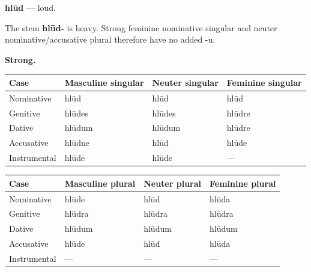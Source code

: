 \par\begin{minipage}{\linewidth}\raggedright
\textbf{hlūd} — loud.

The stem \textbf{hlūd-} is heavy. Strong feminine nominative singular and neuter nominative/\allowbreak{}accusative plural therefore have no added -u.

\textbf{Strong.}

\par\begingroup
\fontsize{10.5}{13.2}\selectfont
\setlength{\LTleft}{0pt}\setlength{\LTright}{\fill}
\noindent
\begin{tabular}{@{}>{\raggedright\arraybackslash}p{22.0mm}>{\raggedright\arraybackslash}p{31.188mm}>{\raggedright\arraybackslash}p{31.188mm}>{\raggedright\arraybackslash}p{31.188mm}@{}}
\toprule
\textbf{Case} & \textbf{Masculine singular} & \textbf{Neuter singular} & \textbf{Feminine singular} \\
\midrule
Nominative & hlūd & hlūd & hlūd \\
Genitive & hlūdes & hlūdes & hlūdre \\
Dative & hlūdum & hlūdum & hlūdre \\
Accusative & hlūdne & hlūd & hlūde \\
Instrumental & hlūde & hlūde & — \\
\bottomrule
\end{tabular}
\par\endgroup
\end{minipage}\par
\par\addvspace{5pt}
\par\begingroup
\fontsize{10.5}{13.2}\selectfont
\setlength{\LTleft}{0pt}\setlength{\LTright}{\fill}
\noindent
\begin{tabular}{@{}>{\raggedright\arraybackslash}p{22.0mm}>{\raggedright\arraybackslash}p{31.188mm}>{\raggedright\arraybackslash}p{31.188mm}>{\raggedright\arraybackslash}p{31.188mm}@{}}
\toprule
\textbf{Case} & \textbf{Masculine plural} & \textbf{Neuter plural} & \textbf{Feminine plural} \\
\midrule
Nominative & hlūde & hlūd & hlūda \\
Genitive & hlūdra & hlūdra & hlūdra \\
Dative & hlūdum & hlūdum & hlūdum \\
Accusative & hlūde & hlūd & hlūda \\
Instrumental & — & — & — \\
\bottomrule
\end{tabular}
\par\endgroup

